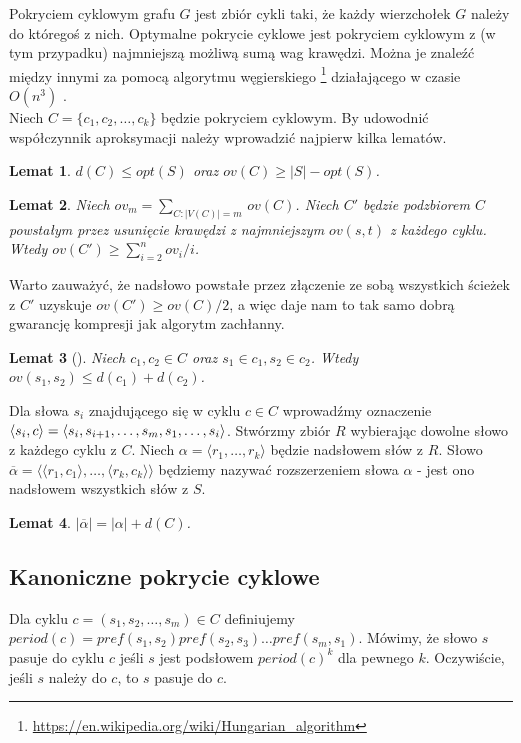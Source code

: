 \documentclass[12pt]{article}
\newtheorem{lemma}{Lemat}[section]
\begin{document}
Pokryciem cyklowym grafu $G$ jest zbiór cykli taki, że każdy wierzchołek $G$ należy do któregoś z nich.
Optymalne pokrycie cyklowe jest pokryciem cyklowym z (w tym przypadku) najmniejszą możliwą sumą wag krawędzi.
Można je znaleźć między innymi za pomocą algorytmu węgierskiego \footnote{\url{https://en.wikipedia.org/wiki/Hungarian_algorithm}} działającego w czasie $O(n^3)$ . \\

Niech $C=\{c_1,c_2,\dots,c_k\}$ będzie pokryciem cyklowym.
By udowodnić współczynnik aproksymacji należy wprowadzić najpierw kilka lematów.

\begin{lemma}
$d(C) \leq opt(S)$ oraz $ov(C) \geq |S|-opt(S)$.
\end{lemma}
\begin{lemma}
Niech $ov_m=\sum_{C:|V(C)|=m}\,ov(C)$.
Niech $C'$ będzie podzbiorem $C$ powstałym przez usunięcie krawędzi z najmniejszym $ov(s,t)$ z każdego cyklu.
Wtedy $ov(C') \geq \sum_{i=2}^n ov_i/i$.
\end{lemma}
Warto zauważyć, że nadsłowo powstałe przez złączenie ze sobą wszystkich ścieżek z $C'$ uzyskuje $ov(C') \geq ov(C)/2$, a więc daje nam to tak samo dobrą gwarancję kompresji jak algorytm zachłanny.
\begin{lemma}[\cite{Blum-Jiang}]
Niech $c_1,c_2 \in C$ oraz $s_1 \in c_1, s_2 \in c_2$.
Wtedy $ov(s_1,s_2) \leq d(c_1)+d(c_2)$.
\end{lemma}
Dla słowa $s_i$ znajdującego się w cyklu $c \in C$ wprowadźmy oznaczenie $\langle s_i,c \rangle = \\ \langle s_i,s_{i+1},\dots,s_m,s_1,\dots,s_i \rangle$.
Stwórzmy zbiór $R$ wybierając dowolne słowo z każdego cyklu z $C$.
Niech $\alpha=\langle r_1,\dots,r_k \rangle$ będzie nadsłowem słów z $R$.
Słowo $\overline{\alpha}=\langle \langle r_1,c_1 \rangle,\dots,\langle r_k,c_k \rangle \rangle$ będziemy nazywać rozszerzeniem słowa $\alpha$ - jest ono nadsłowem wszystkich słów z $S$.
\begin{lemma}
$|\overline{\alpha}|=|\alpha|+d(C)$.
\end{lemma}

\subsection{Kanoniczne pokrycie cyklowe}

Dla cyklu $c = (s_1,s_2,\dots,s_m) \in C$ definiujemy $period(c)=pref(s_1,s_2)pref(s_2,s_3) \dots pref(s_m,s_1)$.
Mówimy, że słowo $s$ pasuje do cyklu $c$ jeśli $s$ jest podsłowem $period(c)^k$ dla pewnego $k$.
Oczywiście, jeśli $s$ należy do $c$, to $s$ pasuje do $c$. \\
\end{document}
